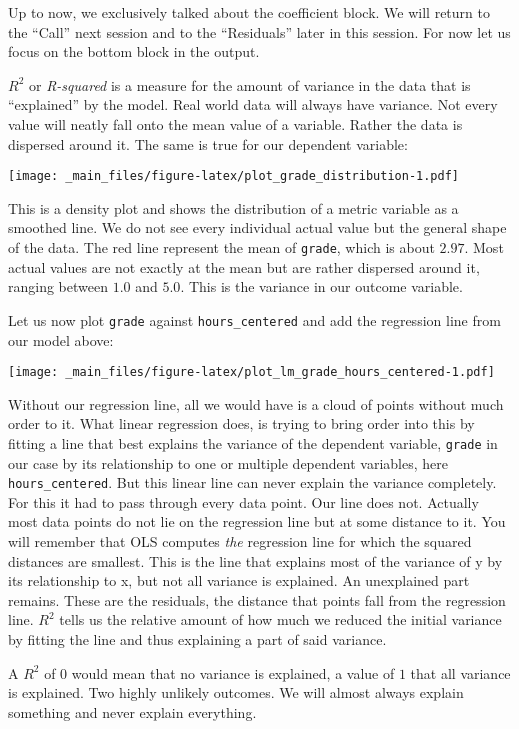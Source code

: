 \documentclass[
]{book}
\begin{document}
Up to now, we exclusively talked about the coefficient block. We will return to
the ``Call'' next session and to the ``Residuals'' later in this session. For now
let us focus on the bottom block in the output.

\(R^2\) or \emph{R-squared} is a measure for the amount of variance in the data that is
``explained'' by the model. Real world data will always have variance. Not every
value will neatly fall onto the mean value of a variable. Rather the data is
dispersed around it. The same is true for our dependent variable:

\texttt{[image: \_main\_files/figure-latex/plot\_grade\_distribution-1.pdf]}

This is a density plot and shows the distribution of a metric variable as a
smoothed line. We do not see every individual actual value but the general shape
of the data. The red line represent the mean of \texttt{grade}, which is about \(2.97\).
Most actual values are not exactly at the mean but are rather dispersed around
it, ranging between \(1.0\) and \(5.0\). This is the variance in our outcome
variable.

Let us now plot \texttt{grade} against \texttt{hours\_centered} and add the regression line
from our model above:

\texttt{[image: \_main\_files/figure-latex/plot\_lm\_grade\_hours\_centered-1.pdf]}

Without our regression line, all we would have is a cloud of points without much
order to it. What linear regression does, is trying to bring order into this by
fitting a line that best explains the variance of the dependent variable, \texttt{grade}
in our case by its relationship to one or multiple dependent variables, here
\texttt{hours\_centered}.
But this linear line can never explain the variance completely.
For this it had to pass through every data point. Our line does not. Actually
most data points do not lie on the regression line but at some distance to it.
You will remember that OLS computes \emph{the} regression line for which the squared
distances are smallest. This is the line that explains most of the variance of y
by its relationship to x, but not all variance is explained. An unexplained part
remains. These are the residuals, the distance that points fall from the
regression line. \(R^2\) tells us the relative amount of how much we reduced the
initial variance by fitting the line and thus explaining a part of said
variance.

A \(R^2\) of \(0\) would mean that no variance is explained, a value of \(1\) that all
variance is explained. Two highly unlikely outcomes. We will almost always
explain something and never explain everything.
\end{document}

